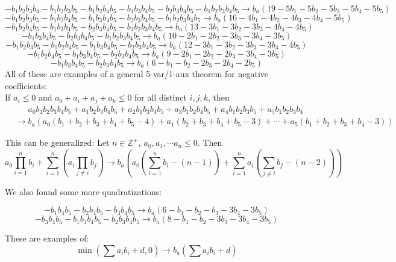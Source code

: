 \documentclass[11pt]{scrartcl}
\begin{document}
\author{} 
\date{SEP 2019}

\[ -b_1 b_2 b_3 b_4-b_1b_2b_3b_5-b_1b_2b_4b_5-b_1b_3b_4b_5-b_2b_3b_4b_5-b_1b_2b_3b_4b_5
\longrightarrow b_a(19-5b_1 -5b_2 -5b_3 -5b_4 -5b_5)\]
\vspace{-5mm}
\[-b_1b_2b_3b_5-b_1b_2b_4b_5-b_1b_3b_4b_5-b_2b_3b_4b_5-b_1b_2b_3b_4b_5
\longrightarrow b_a(16-4b_1 -4b_2 -4b_3 -4b_4 -5b_5)\]
\vspace{-5mm}
\[-b_1b_2b_4b_5-b_1b_3b_4b_5-b_2b_3b_4b_5-b_1b_2b_3b_4b_5
\longrightarrow b_a(13 -3b_1-3b_2-3b_3-4b_4-4b_5)\]
\vspace{-5mm}
\[-b_1b_3b_4b_5-b_2b_3b_4b_5-b_1b_2b_3b_4b_5
\longrightarrow b_a(10-2b_1-2b_2-3b_3-3b_4-3b_5)\]
\vspace{-5mm}
\[-b_1b_2b_3b_5-b_1b_2b_4b_5-b_1b_3b_4b_5-b_2b_3b_4b_5
\longrightarrow b_a(12-3b_1-3b_2-3b_3-3b_4-4b_5)\]
\vspace{-5mm}
\[-b_1b_2b_4b_5-b_1b_3b_4b_5-b_2b_3b_4b_5
\longrightarrow b_a(9-2b_1-2b_2-2b_3-3b_4-3b_5)\]
\vspace{-5mm}
\[-b_1b_3b_4b_5-b_2b_3b_4b_5
\longrightarrow b_a(6-b_1-b_2-2b_3-2b_4-2b_5)\]
\vspace{3mm}
All of these are examples of a general 5-var/1-aux theorem for negative coefficients: \\
\vspace{3mm}
If $a_i \le 0 $ and $a_0 + a_i + a_j +a_k\le 0 $ for all distinct $i, j, k $, then 
\vspace{-3mm}
\begin{align*}
&	\phantom{\longrightarrow} a_0 b_1b_2b_3b_4b_5+ a_1b_2b_3b_4b_5+a_2b_1b_3b_4b_5+a_3b_1b_2b_4b_5+a_4b_1b_2b_3b_5+a_5b_1b_2b_3b_4 \\
&	\longrightarrow b_a\left(a_0(b_1+b_2+b_3+b_4+b_5-4)+a_1(b_2+b_3+b_4+b_5 - 3) + \cdots + a_5(b_1+b_2+b_3+b_4 - 3)\right)
\end{align*}

This can be generalized:
Let $n \in \mathbb{Z}^+,\ a_0, a_1, \cdots a_n \le 0$. Then \[ a_0 \prod_{i = 1}^n b_i + \sum_{i = 1}^n \left( a_i \prod_{j \neq i} b_j\right) \longrightarrow  b_a \left(a_0\left(\sum_{i=1}^n b_i - (n-1)\right) + \sum_{i=1}^n a_i \left( \sum_{j \neq i} b_j - (n-2)\right) \right) \]



\vspace{15mm}
We also found some more quadratizations:

\[-b_1 b_4 b_5 - b_2 b_4 b_5 -b_3 b_4 b_5 \longrightarrow  b_a(6 -b_1 -b_2 -b_3 -3b_4 -3b_5) \]
\[-b_3 b_4 b_5 - b_1 b_3 b_4 b_5 - b_2 b_3 b_4 b_5 \longrightarrow b_a(8-b_1 - b_2 - 3b_3 -3b_4 -3b_5) \]


These are examples of:
\[\min \left ( \sum a_i b_i + d, 0\right) \longrightarrow b_a\left(\sum a_i b_i + d \right) \] 
\end{document}
